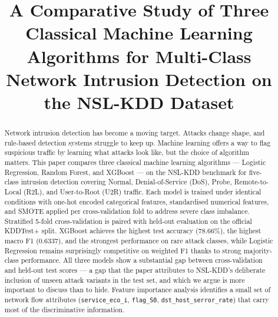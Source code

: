 \documentclass[conference, twocolumn]{IEEEtran}
\begin{document}
\title{A Comparative Study of Three Classical Machine Learning Algorithms for Multi-Class Network Intrusion Detection on the NSL-KDD Dataset}

\author{
}

\maketitle

\begin{abstract}
Network intrusion detection has become a moving target. Attacks change shape, and rule-based detection systems struggle to keep up. Machine learning offers a way to flag suspicious traffic by learning what attacks look like, but the choice of algorithm matters. This paper compares three classical machine learning algorithms --- Logistic Regression, Random Forest, and XGBoost --- on the NSL-KDD benchmark for five-class intrusion detection covering Normal, Denial-of-Service (DoS), Probe, Remote-to-Local (R2L), and User-to-Root (U2R) traffic. Each model is trained under identical conditions with one-hot encoded categorical features, standardised numerical features, and SMOTE applied per cross-validation fold to address severe class imbalance. Stratified 5-fold cross-validation is paired with held-out evaluation on the official KDDTest+ split. XGBoost achieves the highest test accuracy (78.66\%), the highest macro F1 (0.6337), and the strongest performance on rare attack classes, while Logistic Regression remains surprisingly competitive on weighted F1 thanks to strong majority-class performance. All three models show a substantial gap between cross-validation and held-out test scores --- a gap that the paper attributes to NSL-KDD's deliberate inclusion of unseen attack variants in the test set, and which we argue is more important to discuss than to hide. Feature importance analysis identifies a small set of network flow attributes (\texttt{service\_eco\_i}, \texttt{flag\_S0}, \texttt{dst\_host\_serror\_rate}) that carry most of the discriminative information.
\end{abstract}
\end{document}
